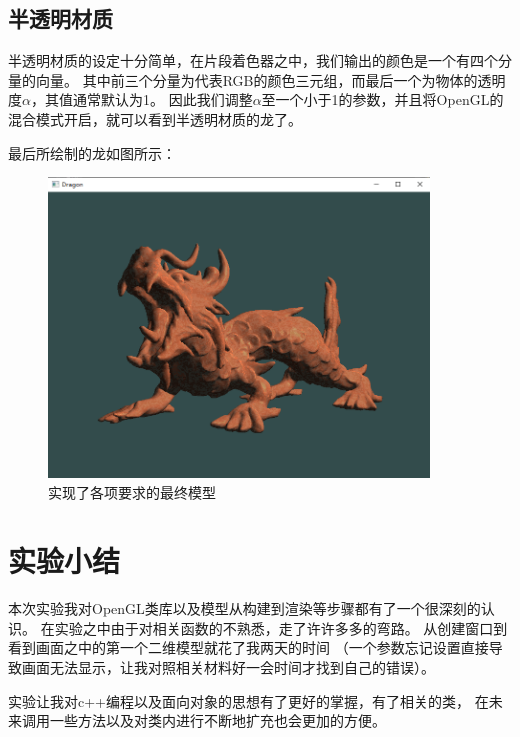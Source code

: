 \documentclass[UTF8]{ctexart}
\begin{document}
\subsection{半透明材质}
\par
半透明材质的设定十分简单，在片段着色器之中，我们输出的颜色是一个有四个分量的向量。
其中前三个分量为代表RGB的颜色三元组，而最后一个为物体的透明度$\alpha$，其值通常默认为1。
因此我们调整$\alpha$至一个小于1的参数，并且将OpenGL的混合模式开启，就可以看到半透明材质的龙了。
\par
最后所绘制的龙如图所示：

\begin{figure}[h]
	\centering
	\includegraphics*[width=0.9\textwidth]{7.png}
	\caption{实现了各项要求的最终模型}
    \label{fig:7}
\end{figure}

\section{实验小结}
\par
本次实验我对OpenGL类库以及模型从构建到渲染等步骤都有了一个很深刻的认识。
在实验之中由于对相关函数的不熟悉，走了许许多多的弯路。
从创建窗口到看到画面之中的第一个二维模型就花了我两天的时间
（一个参数忘记设置直接导致画面无法显示，让我对照相关材料好一会时间才找到自己的错误）。
\par
实验让我对c++编程以及面向对象的思想有了更好的掌握，有了相关的类，
在未来调用一些方法以及对类内进行不断地扩充也会更加的方便。
\end{document}
